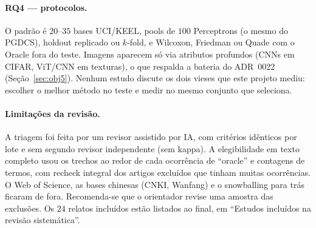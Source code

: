 \paragraph{RQ4 --- protocolos.} O padrão é $20$--$35$ bases UCI/KEEL, pools de
$100$ Perceptrons (o mesmo do PGDCS), holdout replicado ou $k$-fold, e Wilcoxon,
Friedman ou Quade com o Oracle fora do teste. Imagens aparecem só via atributos
profundos (CNNs em CIFAR, ViT/CNN em texturas), o que respalda a bateria do
ADR~0022 (Seção~\ref{sec:obj5}). Nenhum estudo discute os dois vieses que este
projeto mediu: escolher o melhor método no teste e medir no mesmo conjunto que
seleciona.

\paragraph{Limitações da revisão.} A triagem foi feita por um revisor assistido
por IA, com critérios idênticos por lote e sem segundo revisor independente (sem
kappa). A elegibilidade em texto completo usou os trechos ao redor de cada
ocorrência de ``oracle'' e contagens de termos, com recheck integral dos
artigos excluídos que tinham muitas ocorrências. O Web of Science, as bases
chinesas (CNKI, Wanfang) e o snowballing para trás ficaram de fora. Recomenda-se
que o orientador revise uma amostra das exclusões. Os $24$ relatos incluídos
estão listados ao final, em ``Estudos incluídos na revisão sistemática''.
